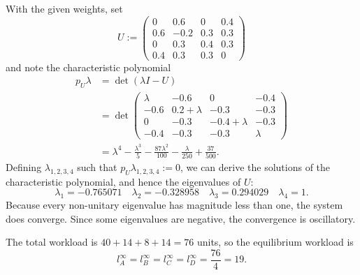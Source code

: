 \documentclass{article}
\numberwithin{equation}{section}
\numberwithin{table}{section}
\numberwithin{figure}{section}
\begin{document}
\begin{enumerate}
\begin{enumerate}
            With the given weights, set
            \begin{equation}
                U := \begin{pmatrix}
                    0   &  0.6 &   0 & 0.4 \\
                    0.6 & -0.2 & 0.3 & 0.3 \\
                    0   &  0.3 & 0.4 & 0.3 \\
                    0.4 &  0.3 & 0.3 &   0
                \end{pmatrix}
            \end{equation}
            and note the characteristic polynomial
            \begin{align}
                p_U\lambda &= \det(\lambda I - U) \\
                &= \det\begin{pmatrix}
                    \lambda &          -0.6 &              0 & -0.4    \\
                       -0.6 & 0.2 + \lambda &           -0.3 & -0.3    \\
                          0 &          -0.3 & -0.4 + \lambda & -0.3    \\
                       -0.4 &          -0.3 &           -0.3 & \lambda
                \end{pmatrix} \\
                &= \lambda ^4-\frac{\lambda ^3}{5}-\frac{87 \lambda ^2}{100}-
                    \frac{\lambda}{250}+\frac{37}{500}.
            \end{align}
            Defining $\lambda_{1,2,3,4}$ such that $p_U\lambda_{1,2,3,4} := 0$,
            we can derive the solutions of the characteristic polynomial, and
            hence the eigenvalues of $U$:
            \begin{equation}
                \lambda_1 = -0.765071 \quad
                \lambda_2 = -0.328958 \quad
                \lambda_3 = 0.294029 \quad
                \lambda_4 = 1.
            \end{equation}
            Because every non-unitary eigenvalue has magnitude less than one,
            the system does converge. Since some eigenvalues are negative, the
            convergence is oscillatory.

            The total workload is $40+14+8+14=76$ units, so the equilibrium
            workload is
            \begin{equation}
                l^\infty_A = l^\infty_B = l^\infty_C = l^\infty_D =
                \frac{76}{4} = 19.
            \end{equation}


\end{enumerate}
\end{enumerate}
\end{document}
